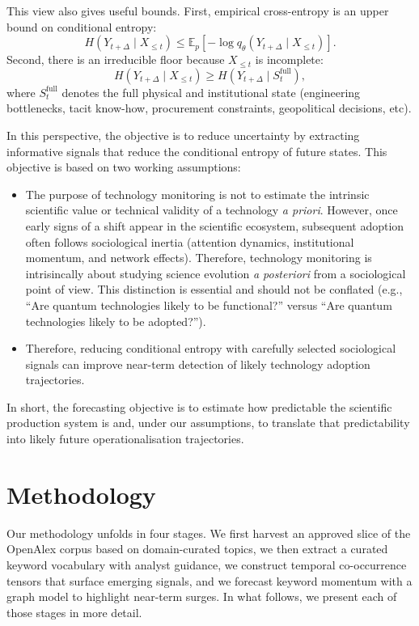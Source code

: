 \documentclass{article}
\begin{document}
This view also gives useful bounds. First, empirical cross-entropy is an upper bound on conditional entropy:
\[
H(Y_{t+\Delta}\mid X_{\leq t})
\leq
\mathbb{E}_{p}\!\left[-\log q_{\theta}(Y_{t+\Delta}\mid X_{\leq t})\right].
\]
Second, there is an irreducible floor because $X_{\leq t}$ is incomplete:
\[
H(Y_{t+\Delta}\mid X_{\leq t})
\geq
H(Y_{t+\Delta}\mid S^{\mathrm{full}}_{t}),
\]
where $S^{\mathrm{full}}_{t}$ denotes the full physical and institutional state (engineering bottlenecks, tacit know-how, procurement constraints, geopolitical decisions, etc).
\newline

In this perspective, the objective is to reduce uncertainty by extracting informative signals that reduce the conditional entropy of future states. This objective is based on two working assumptions:
\begin{itemize}
  \item The purpose of technology monitoring is not to estimate the intrinsic scientific value or technical validity of a technology \emph{a priori}.
  However, once early signs of a shift appear in the scientific ecosystem, subsequent adoption often follows sociological inertia (attention dynamics, institutional momentum, and network effects). Therefore, technology monitoring is intrisincally about studying science evolution \emph{a posteriori} from a sociological point of view. This distinction is essential and should not be conflated (e.g., ``Are quantum technologies likely to be functional?'' versus ``Are quantum technologies likely to be adopted?'').
  \item Therefore, reducing conditional entropy with carefully selected sociological signals can improve near-term detection of likely technology adoption trajectories.
\end{itemize}

In short, the forecasting objective is to estimate how predictable the scientific production system is and, under our assumptions, to translate that predictability into likely future operationalisation trajectories.


\section{Methodology}
Our methodology unfolds in four stages.
We first harvest an approved slice of the OpenAlex corpus based on domain-curated topics,
we then extract a curated keyword vocabulary with analyst guidance,
we construct temporal co-occurrence tensors that surface emerging signals,
and we forecast keyword momentum with a graph model to highlight near-term surges.
In what follows, we present each of those stages in more detail.
\end{document}
